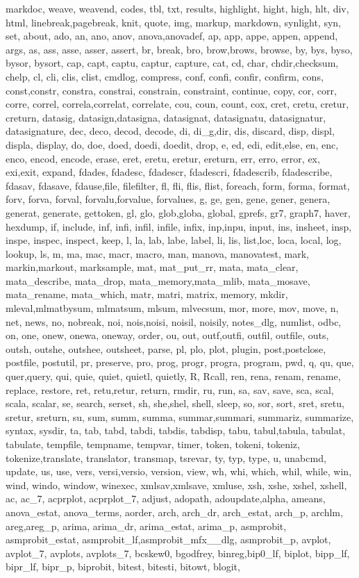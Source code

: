 {{	markdoc, weave, weavend, codes, tbl, txt, results, highlight, hight, high, hlt, div, html, linebreak,pagebreak, knit, quote, img, markup, markdown, synlight, syn, set, about, ado, an, ano, anov, anova,anovadef, ap, app, appe, appen, append, args, as, ass, asse, asser, assert, br, break, bro, brow,brows, browse, by, bys, byso, bysor, bysort, cap, capt, captu, captur, capture, cat, cd, char, chdir,checksum, chelp, cl, cli, clis, clist, cmdlog, compress, conf, confi, confir, confirm, cons, const,constr, constra, constrai, constrain, constraint, continue, copy, cor, corr, corre, correl, correla,correlat, correlate, cou, coun, count, cox, cret, cretu, cretur, creturn, datasig, datasign,datasigna, datasignat, datasignatu, datasignatur, datasignature, dec, deco, decod, decode, di, di_g,dir, dis, discard, disp, displ, displa, display, do, doe, doed, doedi, doedit, drop, e, ed, edi, edit,else, en, enc, enco, encod, encode, erase, eret, eretu, eretur, ereturn, err, erro, error, ex, exi,exit, expand, fdades, fdadesc, fdadescr, fdadescri, fdadescrib, fdadescribe, fdasav, fdasave, fdause,file, filefilter, fl, fli, flis, flist, foreach, form, forma, format, forv, forva, forval, forvalu,forvalue, forvalues, g, ge, gen, gene, gener, genera, generat, generate, gettoken, gl, glo, glob,globa, global, gprefs, gr7, graph7, haver, hexdump, if, include, inf, infi, infil, infile, infix, inp,inpu, input, ins, insheet, insp, inspe, inspec, inspect, keep, l, la, lab, labe, label, li, lis, list,loc, loca, local, log, lookup, ls, m, ma, mac, macr, macro, man, manova, manovatest, mark, markin,markout, marksample, mat, mat_put_rr, mata, mata_clear, mata_describe, mata_drop, mata_memory,mata_mlib, mata_mosave, mata_rename, mata_which, matr, matri, matrix, memory, mkdir, mleval,mlmatbysum, mlmatsum, mlsum, mlvecsum, mor, more, mov, move, n, net, news, no, nobreak, noi, nois,noisi, noisil, noisily, notes_dlg, numlist, odbc, on, one, onew, onewa, oneway, order, ou, out, outf,outfi, outfil, outfile, outs, outsh, outshe, outshee, outsheet, parse, pl, plo, plot, plugin, post,postclose, postfile, postutil, pr, preserve, pro, prog, progr, progra, program, pwd, q, qu, que, quer,query, qui, quie, quiet, quietl, quietly, R, Rcall, ren, rena, renam, rename, replace, restore, ret, retu,retur, return, rmdir, ru, run, sa, sav, save, sca, scal, scala, scalar, se, search, serset, sh, she,shel, shell, sleep, so, sor, sort, sret, sretu, sretur, sreturn, su, sum, summ, summa, summar,summari, summariz, summarize, syntax, sysdir, ta, tab, tabd, tabdi, tabdis, tabdisp, tabu, tabul,tabula, tabulat, tabulate, tempfile, tempname, tempvar, timer, token, tokeni, tokeniz, tokenize,translate, translator, transmap, tsrevar, ty, typ, type, u, unabcmd, update, us, use, vers, versi,versio, version, view, wh, whi, which, whil, while, win, wind, windo, window, winexec, xmlsav,xmlsave, xmluse, xsh, xshe, xshel, xshell, ac, ac_7, acprplot, acprplot_7, adjust, adopath, adoupdate,alpha, ameans, anova_estat, anova_terms, aorder, arch, arch_dr, arch_estat, arch_p, archlm, areg,areg_p, arima, arima_dr, arima_estat, arima_p, asmprobit, asmprobit_estat, asmprobit_lf,asmprobit_mfx__dlg, asmprobit_p, avplot, avplot_7, avplots, avplots_7, bcskew0, bgodfrey, binreg,bip0_lf, biplot, bipp_lf, bipr_lf, bipr_p, biprobit, bitest, bitesti, bitowt, blogit, }}
